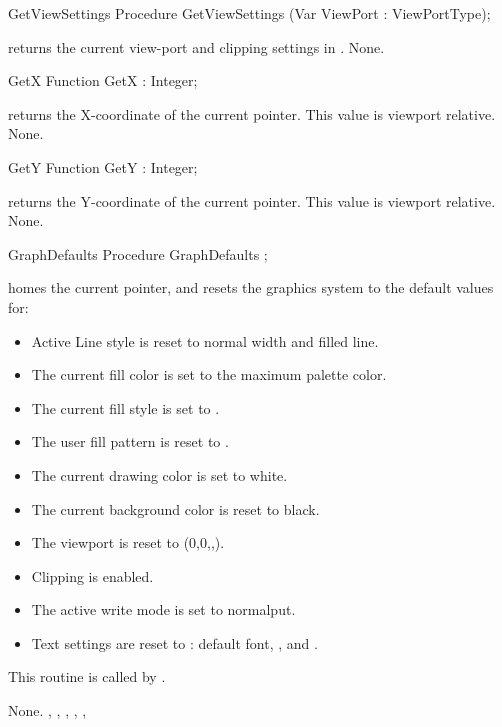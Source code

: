 \begin{procedure}{GetViewSettings}
\Declaration
Procedure GetViewSettings (Var ViewPort : ViewPortType);

\Description
{} returns the current view-port and clipping settings in
.
\Errors
None.
\SeeAlso
{}
\end{procedure}

\begin{function}{GetX}
\Declaration
Function GetX  : Integer;

\Description
{} returns the X-coordinate of the current pointer. This value is
viewport relative.
\Errors
None.
\SeeAlso
{}
\end{function}
\begin{function}{GetY}
\Declaration
Function GetY  : Integer;

\Description
{} returns the Y-coordinate of the current pointer. This value is
viewport relative.
\Errors
None.
\SeeAlso
{}
\end{function}
\begin{procedure}{GraphDefaults}
\Declaration
Procedure GraphDefaults ;

\Description
{} homes the current pointer, and resets the graphics
system to the default values for:

\begin{itemize}
 \item Active Line style is reset to normal width and filled line.
 \item The current fill color is set to the maximum palette color.
 \item The current fill style is set to .
 \item The user fill pattern is reset to .
 \item The current drawing color is set to white.
 \item The current background color is reset to black.
 \item The viewport is reset to (0,0,,).
 \item Clipping is enabled.
 \item The active write mode is set to normalput.
 \item Text settings are reset to : default font, ,
          and .
\end{itemize}

This routine is called by .

\Errors
None.
\SeeAlso
{}, , ,
, , 
\end{procedure}

